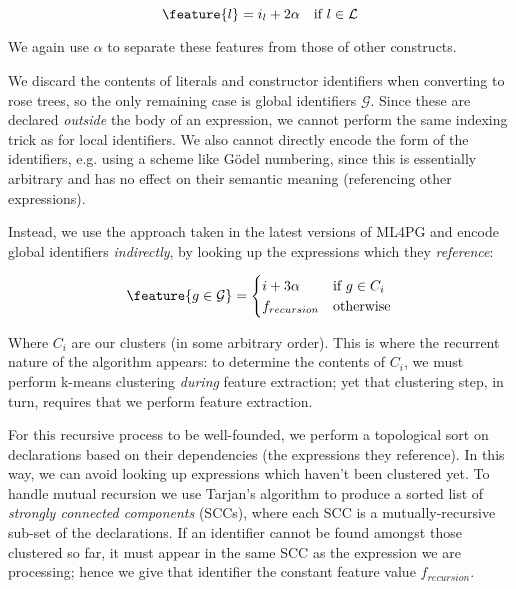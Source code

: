 \begin{equation} \label{eq:localfeature}
  \feature{l} = i_l + 2 \alpha \quad \text{if $l \in \mathcal{L}$}
\end{equation}

We again use $\alpha$ to separate these features from those of other constructs.

We discard the contents of literals and constructor identifiers when converting
to rose trees, so the only remaining case is global identifiers
$\mathcal{G}$. Since these are declared \emph{outside} the body of an
expression, we cannot perform the same indexing trick as for local
identifiers. We also cannot directly encode the form of the identifiers,
e.g. using a scheme like G{\"o}del numbering, since this is essentially
arbitrary and has no effect on their semantic meaning (referencing other
expressions).

Instead, we use the approach taken in the latest versions of ML4PG and encode
global identifiers \emph{indirectly}, by looking up the expressions which they
\emph{reference}:

\begin{equation} \label{eq:globalfeature}
  \feature{g \in \mathcal{G}} =
    \begin{cases}
      i + 3 \alpha \quad & \text{if $g \in C_i$} \\
      f_{recursion}         & \text{otherwise}
    \end{cases}
\end{equation}

Where $C_i$ are our clusters (in some arbitrary order). This is where the
recurrent nature of the algorithm appears: to determine the contents of $C_i$,
we must perform k-means clustering \emph{during} feature extraction; yet that
clustering step, in turn, requires that we perform feature extraction.

For this recursive process to be well-founded, we perform a topological sort on
declarations based on their dependencies (the expressions they reference). In
this way, we can avoid looking up expressions which haven't been clustered
yet. To handle mutual recursion we use Tarjan's algorithm \cite{tarjan1972depth}
to produce a sorted list of \emph{strongly connected components} (SCCs), where
each SCC is a mutually-recursive sub-set of the declarations. If an identifier
cannot be found amongst those clustered so far, it must appear in the same SCC
as the expression we are processing; hence we give that identifier the constant
feature value $f_{recursion}$.

